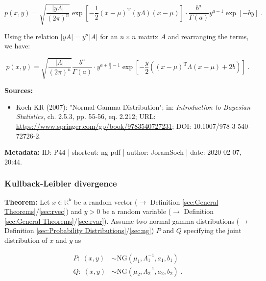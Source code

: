 \documentclass[a4paper,12pt,twoside]{book}
\begin{document}
\begin{equation} \label{eq:ng-pdf-ng-pdf-s2}
p(x,y) = \sqrt{\frac{|y \Lambda|}{(2 \pi)^n}} \exp \left[ -\frac{1}{2} (x-\mu)^\mathrm{T} (y \Lambda) (x-\mu) \right] \cdot \frac{b^a}{\Gamma(a)} y^{a-1} \exp\left[-by\right] \; .
\end{equation}

Using the relation $\lvert y A \rvert = y^n \lvert A \rvert$ for an $n \times n$ matrix $A$ and rearranging the terms, we have:

\begin{equation} \label{eq:ng-pdf-ng-pdf-qed}
p(x,y) = \sqrt{\frac{|\Lambda|}{(2 \pi)^n}} \frac{b^a}{\Gamma(a)} \cdot y^{a+\frac{n}{2}-1} \exp \left[ -\frac{y}{2} \left( (x-\mu)^\mathrm{T} \Lambda (x-\mu) + 2b \right) \right] \; .
\end{equation}


\vspace{1em}
\textbf{Sources:}
\begin{itemize}
\item Koch KR (2007): "Normal-Gamma Distribution"; in: \textit{Introduction to Bayesian Statistics}, ch. 2.5.3, pp. 55-56, eq. 2.212; URL: \url{https://www.springer.com/gp/book/9783540727231}; DOI: 10.1007/978-3-540-72726-2.
\end{itemize}


\vspace{1em}
\textbf{Metadata:} ID: P44 | shortcut: ng-pdf | author: JoramSoch | date: 2020-02-07, 20:44.
\vspace{1em}



\subsubsection[\textbf{Kullback-Leibler divergence}]{Kullback-Leibler divergence} \label{sec:ng-kl}
\setcounter{equation}{0}

\textbf{Theorem:} Let $x \in \mathbb{R}^k$ be a random vector ($\rightarrow$ Definition \ref{sec:General Theorems}/\ref{sec:rvec}) and $y > 0$ be a random variable ($\rightarrow$ Definition \ref{sec:General Theorems}/\ref{sec:rvar}). Assume two normal-gamma distributions ($\rightarrow$ Definition \ref{sec:Probability Distributions}/\ref{sec:ng}) $P$ and $Q$ specifying the joint distribution of $x$ and $y$ as

\begin{equation} \label{eq:ng-kl-NGs}
\begin{split}
P: \; (x,y) &\sim \mathrm{NG}(\mu_1, \Lambda_1^{-1}, a_1, b_1) \\
Q: \; (x,y) &\sim \mathrm{NG}(\mu_2, \Lambda_2^{-1}, a_2, b_2) \; . \\
\end{split}
\end{equation}
\end{document}
